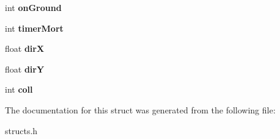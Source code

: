 \begin{DoxyCompactItemize}
int {\bfseries on\+Ground}
\item 
\mbox{\label{structHero_a3c15fd1414e5c26aa4cce332b84dfeef}} 
int {\bfseries timer\+Mort}
\item 
\mbox{\label{structHero_a5f39f26486843c33157a828f54cf3139}} 
float {\bfseries dirX}
\item 
\mbox{\label{structHero_a2afbc69f7880e2e2f1401f27bbece432}} 
float {\bfseries dirY}
\item 
\mbox{\label{structHero_abf3bc568c335516e8bfebd7191d3d340}} 
int {\bfseries coll}
\end{DoxyCompactItemize}


The documentation for this struct was generated from the following file\+:\begin{DoxyCompactItemize}
\item 
structs.\+h\end{DoxyCompactItemize}

